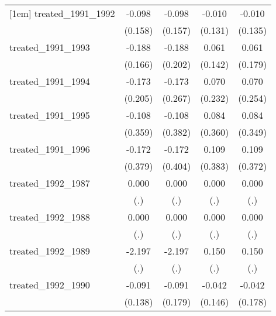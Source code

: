 {\begin{tabular}{l*{4}{c}}
[1em]
treated\_1991\_1992&      -0.098         &      -0.098         &      -0.010         &      -0.010         \\
            &     (0.158)         &     (0.157)         &     (0.131)         &     (0.135)         \\
[1em]
treated\_1991\_1993&      -0.188         &      -0.188         &       0.061         &       0.061         \\
            &     (0.166)         &     (0.202)         &     (0.142)         &     (0.179)         \\
[1em]
treated\_1991\_1994&      -0.173         &      -0.173         &       0.070         &       0.070         \\
            &     (0.205)         &     (0.267)         &     (0.232)         &     (0.254)         \\
[1em]
treated\_1991\_1995&      -0.108         &      -0.108         &       0.084         &       0.084         \\
            &     (0.359)         &     (0.382)         &     (0.360)         &     (0.349)         \\
[1em]
treated\_1991\_1996&      -0.172         &      -0.172         &       0.109         &       0.109         \\
            &     (0.379)         &     (0.404)         &     (0.383)         &     (0.372)         \\
[1em]
treated\_1992\_1987&       0.000         &       0.000         &       0.000         &       0.000         \\
            &         (.)         &         (.)         &         (.)         &         (.)         \\
[1em]
treated\_1992\_1988&       0.000         &       0.000         &       0.000         &       0.000         \\
            &         (.)         &         (.)         &         (.)         &         (.)         \\
[1em]
treated\_1992\_1989&      -2.197         &      -2.197         &       0.150         &       0.150         \\
            &         (.)         &         (.)         &         (.)         &         (.)         \\
[1em]
treated\_1992\_1990&      -0.091         &      -0.091         &      -0.042         &      -0.042         \\
            &     (0.138)         &     (0.179)         &     (0.146)         &     (0.178)         \\

\end{tabular}}
